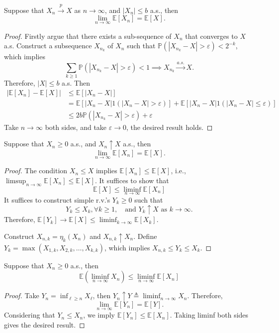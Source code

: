 \begin{theorem}
Suppose that $X_n\xrightarrow{p}X$ as $n\to\infty$, and $|X_n|\le b$ a.s., then
\[
\lim_{n\to\infty}\mathbb{E}[X_n] = \mathbb{E}[X].
\]
\end{theorem}
\begin{proof}
Firstly argue that there exists a sub-sequence of $X_n$ that converges to $X$ a.s.
Construct a subsequence $X_{n_k}$ of $X_n$ such that $\mathbb{P}(|X_{n_k} - X|>\varepsilon)<2^{-k}$, which implies 
\[
\sum_{k\ge1}\mathbb{P}(|X_{n_k} - X|>\varepsilon)<1\implies
X_{n_k}\xrightarrow{a.s.}X.
\]
Therefore, $|X|\le b$ a.s. Then
\begin{align*}
|\mathbb{E}[X_n] - \mathbb{E}[X]|&\le \mathbb{E}[|X_n - X|]\\
&=\mathbb{E}[|X_n - X|1(|X_n - X|>\varepsilon)] + \mathbb{E}[|X_n - X|1(|X_n - X|\le\varepsilon)] 
\\&\le 2b\mathbb{P}(|X_{n_k} - X|>\varepsilon)+\varepsilon
\end{align*}
Take $n\to\infty$ both sides, and take $\varepsilon\to0$, the desired result holds.
\end{proof}

\begin{theorem}
Suppose that $X_n\ge0$ a.s., and $X_n\uparrow X$ a.s., then
\[
\lim_{n\to\infty}\mathbb{E}[X_n] = \mathbb{E}[X].
\]
\end{theorem}
\begin{proof}
The condition $X_n\le X$ implies $\mathbb{E}[X_n] \le \mathbb{E}[X]$, i.e.,
$\limsup_{n\to\infty}\mathbb{E}[X_n] \le \mathbb{E}[X]$.
It suffices to show that 
\[
\mathbb{E}[X]\le \liminf_{n\to\infty}\mathbb{E}[X_n]
\]
It suffices to construct simple r.v.'s $Y_k\ge0$ such that 
\[
Y_k\le X_k,\forall k\ge1, \quad\text{and $Y_k\uparrow X$ as $k\to\infty$.}
\] 
Therefore, $\mathbb{E}[Y_k]\to\mathbb{E}[X]\le \liminf_{k\to\infty}\mathbb{E}[X_k]$.

Construct $X_{n,k} = \eta_k(X_n)$ and $X_{n,k}\uparrow X_n$. Define $Y_k = \max(X_{1,k},X_{2,k},\ldots,X_{k,k})$, which implies $X_{n,k}\le Y_k\le X_k$.


\end{proof}

\begin{theorem}
Suppose that $X_n\ge0$ a.s., then
\[
\mathbb{E}\left(
\liminf_{n\to\infty}X_n
\right)\le \liminf_{n\to\infty}\mathbb{E}[X_n]
\]
\end{theorem}
\begin{proof}
Take $Y_n=\inf_{\ell\ge n}X_{\ell}$, then $Y_n\uparrow Y\triangleq \liminf_{n\to\infty}X_n$.
Therefore,
\[
\lim_{n\to\infty}\mathbb{E}[Y_n] = \mathbb{E}[Y].
\]
Considering that $Y_n\le X_n$, we imply $\mathbb{E}[Y_n] \le \mathbb{E}[X_n]$.
Taking liminf both sides gives the desired result.
\end{proof}

